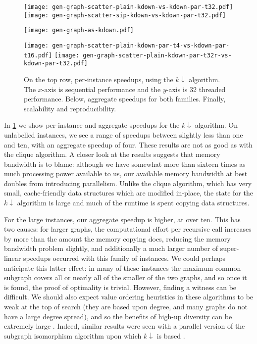 \documentclass[sigconf]{acmart}
\begin{document}
\begin{figure}[tb]
    \texttt{[image: gen-graph-scatter-plain-kdown-vs-kdown-par-t32.pdf]}
    \hfill
    \texttt{[image: gen-graph-scatter-sip-kdown-vs-kdown-par-t32.pdf]}

    \vspace*{1em}

    \texttt{[image: gen-graph-as-kdown.pdf]}

    \vspace*{1em}

    \texttt{[image: gen-graph-scatter-plain-kdown-par-t4-vs-kdown-par-t16.pdf]}
    \hfill
    \texttt{[image: gen-graph-scatter-plain-kdown-par-t32r-vs-kdown-par-t32.pdf]}

    \caption{On the top row, per-instance speedups, using the $k{\downarrow}$ algorithm. The
    $x$-axis is sequential performance and the $y$-axis is 32 threaded performance. Below,
    aggregate speedups for both families. Finally, scalability and reproducibility.}\label{figure:kdownscatters}
\end{figure}

In \cref{figure:kdownscatters} we show per-instance and aggregate speedups for the $k{\downarrow}$
algorithm. On unlabelled instances, we see a range of speedups between slightly less than one and
ten, with an aggregate speedup of four. These results are not as good as with the clique algorithm.
A closer look at the results suggests that memory bandwidth is to blame: although we have somewhat
more than sixteen times as much processing power available to us, our available memory bandwidth at
best doubles from introducing parallelism. Unlike the clique algorithm, which has very small,
cache-friendly data structures which are modified in-place, the state for the $k{\downarrow}$
algorithm is large and much of the runtime is spent copying data structures.

For the large instances, our aggregate speedup is higher, at over ten. This has two causes: for
larger graphs, the computational effort per recursive call increases by more than the amount the
memory copying does, reducing the memory bandwidth problem slightly, and additionally a much larger
number of super-linear speedups occurred with this family of instances. We could perhaps anticipate
this latter effect: in many of these instances the maximum common subgraph covers all or nearly all
of the smaller of the two graphs, and so once it is found, the proof of optimality is trivial.
However, finding a witness can be difficult. We should also expect value ordering heuristics in
these algorithms to be weak at the top of search (they are based upon degree, and many graphs do not
have a large degree spread), and so the benefits of high-up diversity can be extremely large
\citep{DBLP:conf/ijcai/HarveyG95,DBLP:conf/cp/ChuSS09,DBLP:journals/topc/McCreeshP15}. Indeed,
similar results were seen with a parallel version of the subgraph isomorphism algorithm upon which
$k{\downarrow}$ is based \citep{DBLP:conf/cp/McCreeshP15}.
\end{document}
